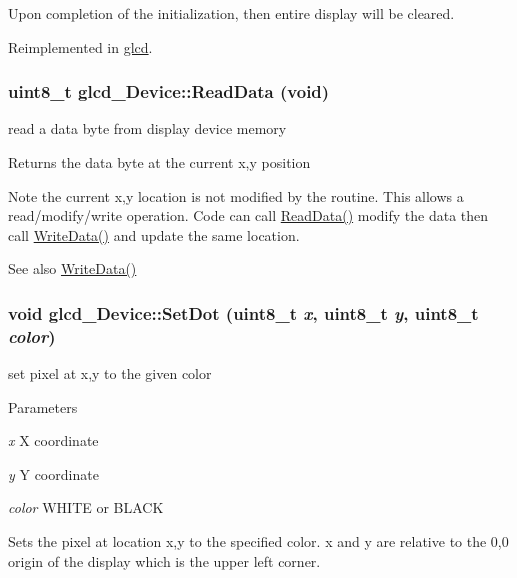 Upon completion of the initialization, then entire display will be cleared. 

Reimplemented in \hyperlink{classglcd_aba75fe511781243aeb06df806bb4782a}{glcd}.\hypertarget{classglcd___device_a2ec1756ae0c7787fad676d6398c73de3}{
\subsubsection[{ReadData}]{\setlength{\rightskip}{0pt plus 5cm}uint8\_\-t glcd\_\-Device::ReadData (void)}}
\label{classglcd___device_a2ec1756ae0c7787fad676d6398c73de3}
read a data byte from display device memory

\begin{DoxyReturn}{Returns}
the data byte at the current x,y position
\end{DoxyReturn}
\begin{DoxyNote}{Note}
the current x,y location is not modified by the routine. This allows a read/modify/write operation. Code can call \hyperlink{classglcd___device_a2ec1756ae0c7787fad676d6398c73de3}{ReadData()} modify the data then call \hyperlink{classglcd___device_a209d1ba245e7e02eb65e07c15ce0461d}{WriteData()} and update the same location.
\end{DoxyNote}
\begin{DoxySeeAlso}{See also}
\hyperlink{classglcd___device_a209d1ba245e7e02eb65e07c15ce0461d}{WriteData()} 
\end{DoxySeeAlso}
\hypertarget{classglcd___device_a1916258e850cd839172ce318a0b903fd}{
\subsubsection[{SetDot}]{\setlength{\rightskip}{0pt plus 5cm}void glcd\_\-Device::SetDot (uint8\_\-t {\em x}, \/  uint8\_\-t {\em y}, \/  uint8\_\-t {\em color})}}
\label{classglcd___device_a1916258e850cd839172ce318a0b903fd}
set pixel at x,y to the given color


\begin{DoxyParams}{Parameters}
\item[{\em x}]X coordinate \item[{\em y}]Y coordinate \item[{\em color}]WHITE or BLACK\end{DoxyParams}
Sets the pixel at location x,y to the specified color. x and y are relative to the 0,0 origin of the display which is the upper left corner.

